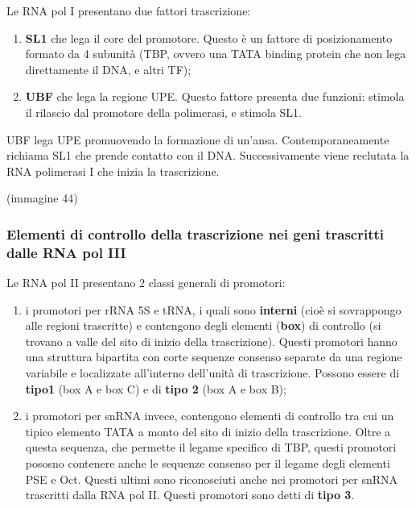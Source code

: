 \documentclass[]{article}
\begin{document}
Le RNA pol I presentano due fattori trascrizione:

\begin{enumerate}
\def\labelenumi{\arabic{enumi}.}
\itemsep1pt\parskip0pt
\item
  \textbf{SL1} che lega il core del promotore. Questo è un fattore di
  posizionamento formato da 4 subunità (TBP, ovvero una TATA binding
  protein che non lega direttamente il DNA, e altri TF);
\item
  \textbf{UBF} che lega la regione UPE. Questo fattore presenta due
  funzioni: stimola il rilascio dal promotore della polimerasi, e
  stimola SL1.
\end{enumerate}

UBF lega UPE promuovendo la formazione di un'ansa. Contemporaneamente
richiama SL1 che prende contatto con il DNA. Successivamente viene
reclutata la RNA polimerasi I che inizia la trascrizione.

(immagine 44)

\subsubsection{Elementi di controllo della trascrizione nei geni
trascritti dalle RNA pol
III}\label{elementi-di-controllo-della-trascrizione-nei-geni-trascritti-dalle-rna-pol-iii}

Le RNA pol II presentano 2 classi generali di promotori:

\begin{enumerate}
\def\labelenumi{\arabic{enumi}.}
\itemsep1pt\parskip0pt
\item
  i promotori per rRNA 5S e tRNA, i quali sono \textbf{interni} (cioè si
  sovrappongo alle regioni trascritte) e contengono degli elementi
  (\textbf{box}) di controllo (si trovano a valle del sito di inizio
  della trascrizione). Questi promotori hanno una struttura bipartita
  con corte sequenze consenso separate da una regione variabile e
  localizzate all'interno dell'unità di trascrizione. Possono essere di
  \textbf{tipo1} (box A e box C) e di \textbf{tipo 2} (box A e box B);
\item
  i promotori per snRNA invece, contengono elementi di controllo tra cui
  un tipico elemento TATA a monto del sito di inizio della trascrizione.
  Oltre a questa sequenza, che permette il legame specifico di TBP,
  questi promotori pososno contenere anche le sequenze consenso per il
  legame degli elementi PSE e Oct. Questi ultimi sono riconosciuti anche
  nei promotori per snRNA trascritti dalla RNA pol II. Questi promotori
  sono detti di \textbf{tipo 3}.
\end{enumerate}
\end{document}
